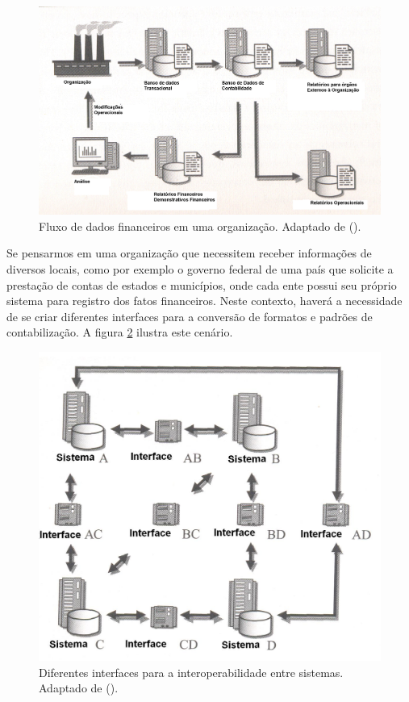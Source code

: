 \documentclass[msc,proposal,hidelot,hideabstract]{ppgccufmg} %
\begin{document}
\begin{figure}[hbtp]
\centering
\includegraphics[width=.75\textwidth]{img/fluxo_informacoes.png}
\caption{Fluxo de dados financeiros em uma organização. Adaptado de (\cite{bergeron2004essentials}).}
\label{fig:fluxo_dados}
\end{figure}

Se pensarmos em uma organização que necessitem receber informações de diversos locais, como por exemplo o governo federal de uma país que solicite a prestação de contas de estados e municípios, onde cada ente possui seu próprio sistema para registro dos fatos financeiros. Neste contexto, haverá a necessidade de se criar diferentes interfaces para a conversão de formatos e padrões de contabilização. A figura \ref{fig:interfaces} ilustra este cenário.


\begin{figure}[hbtp]
\centering
\includegraphics[width=.75\textwidth]{img/interfaces.png}
\caption{Diferentes interfaces para a interoperabilidade entre sistemas. Adaptado de (\cite{bergeron2004essentials}).}
\label{fig:interfaces}
\end{figure}
\end{document}
